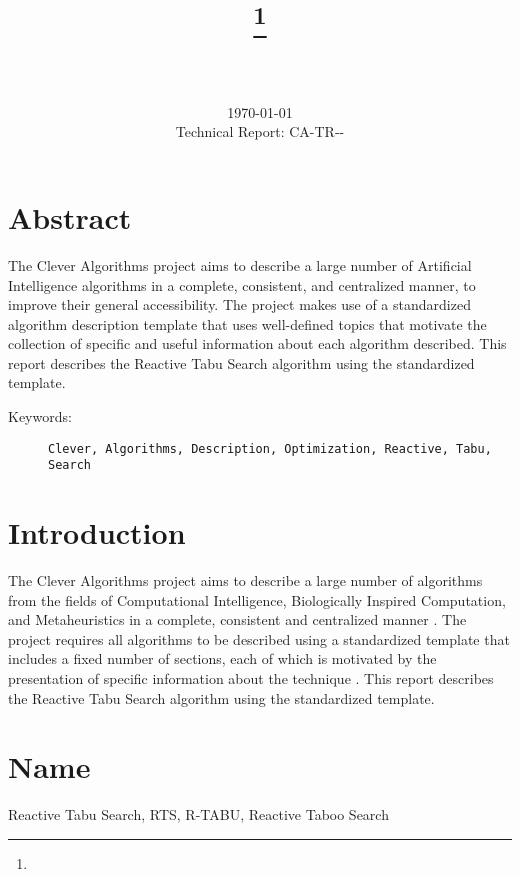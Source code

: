 \documentclass[a4paper, 11pt]{article}
\title{{\myreporttitle}\footnote{\myreportlicense}}
\author{\myreportauthor\\{\myreportemail}\\\small\myreportproject}
\date{\today\\{\small{Technical Report: CA-TR-{\myreportdate}-\myreportversion}}}
\begin{document}
\maketitle

\section*{Abstract} 
The Clever Algorithms project aims to describe a large number of Artificial Intelligence algorithms in a complete, consistent, and centralized manner, to improve their general accessibility. 
The project makes use of a standardized algorithm description template that uses well-defined topics that motivate the collection of specific and useful information about each algorithm described.
This report describes the Reactive Tabu Search algorithm using the standardized template.

\begin{description}
	\item[Keywords:] {\small\texttt{Clever, Algorithms, Description, Optimization, Reactive, Tabu, Search}}
\end{description} 

\section{Introduction} 
\label{sec:intro}
The Clever Algorithms project aims to describe a large number of algorithms from the fields of Computational Intelligence, Biologically Inspired Computation, and Metaheuristics in a complete, consistent and centralized manner \cite{Brownlee2010}.
The project requires all algorithms to be described using a standardized template that includes a fixed number of sections, each of which is motivated by the presentation of specific information about the technique \cite{Brownlee2010a}.
This report describes the Reactive Tabu Search algorithm using the standardized template.

\section{Name} 
\label{sec:name}
Reactive Tabu Search, RTS, R-TABU, Reactive Taboo Search
\end{document}
